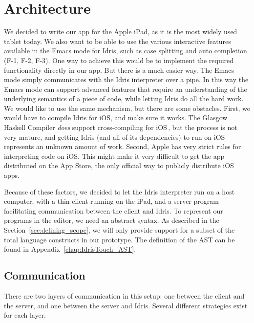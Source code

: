 \chapter{Architecture}
\label{sec:Architecture}

We decided to write our app for the Apple iPad, as it is the most widely used
tablet today. We also want to be able to use the various interactive features
available in the Emacs mode for Idris, such as case
splitting and auto completion (F-1, F-2, F-3). One way to achieve this would be to implement
the required functionality directly in our app. But there is a much easier way.
The Emacs mode simply communicates with the Idris interpreter over a pipe. 
In this way the Emacs mode can support advanced features that require an
understanding of the underlying semantics of a piece of code, while letting
Idris do all the hard work. We would like to use the same mechanism, but there
are some obstacles. First, we would have to compile Idris for iOS, and make 
sure it works. The Glasgow Haskell Compiler \emph{does} support 
cross-compiling for iOS\,\cite{ghc_ios_crosscompiler}, but the process is not very mature, and
getting Idris (and all of its dependencies) to run on iOS represents an 
unknown amount of work. Second, Apple has very strict rules for interpreting
code on iOS\@. This might make it very difficult to get the app distributed on
the App Store, the only official way to publicly distribute iOS apps.

Because of these factors, we decided to let the Idris interpreter run on a 
host computer, with a thin client running on the iPad, and a server program 
facilitating communication between the client and Idris.
To represent our programs in the editor, we need an abstract syntax.
As described in the Section~\ref{sec:defining_scope}, we will only
provide support for a subset of the total language constructs in our prototype.
The definition of the AST can be found in Appendix~\ref{chap:IdrisTouch_AST}.


\section{Communication}
There are two layers of communication in this setup: one between the client and
the server, and one between the server and Idris. Several different strategies
exist for each layer. 

